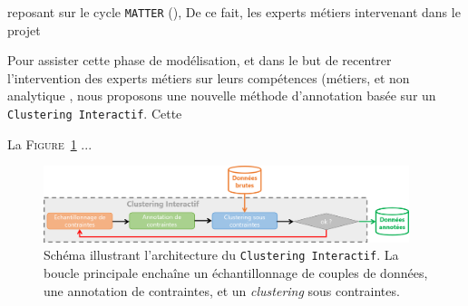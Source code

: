 		reposant sur le cycle \texttt{MATTER} (\cite{pustejovsky-stubbs:2012:natural-language-annotation}), 
		De ce fait, les experts métiers intervenant dans le projet 
		
		Pour assister cette phase de modélisation, et dans le but de recentrer l'intervention des experts métiers sur leurs compétences (métiers, et non analytique , nous proposons une nouvelle méthode d'annotation basée sur un \texttt{Clustering Interactif}.
		Cette
		
		\begin{leftBarImportantGreen}
			La \textsc{Figure~\ref{figure:5.1-GUIDE-PRESENTATION-RAPIDE-CLUSTERING-INTERACTIF}} ...
			
			\begin{figure}[H]
				\centering
				\includegraphics[width=0.95\textwidth]{figures/interactive-clustering-architecture-sequentielle}
				\caption{
					Schéma illustrant l'architecture du \texttt{Clustering Interactif}.
					La boucle principale enchaîne un échantillonnage de couples de données, une annotation de contraintes, et un \textit{clustering} sous contraintes.
				}
				\label{figure:5.1-GUIDE-PRESENTATION-RAPIDE-CLUSTERING-INTERACTIF}
			\end{figure}
		\end{leftBarImportantGreen}
	
	
